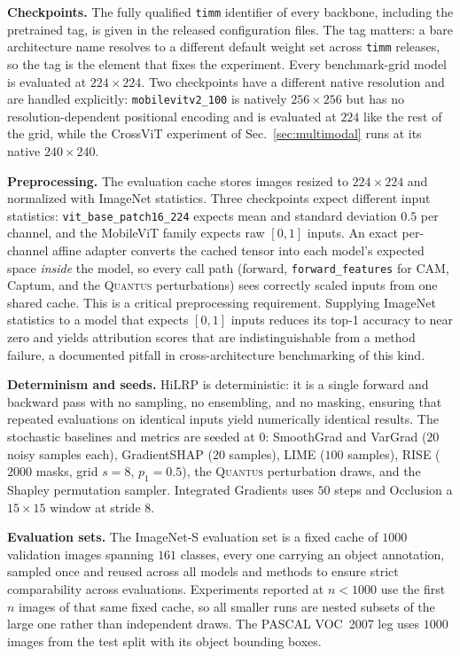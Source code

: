 \documentclass[lettersize,journal]{IEEEtran}
\theoremstyle{definition}
\theoremstyle{plain}
\begin{document}
\textbf{Checkpoints.} The fully qualified \texttt{timm} identifier of every
backbone, including the pretrained tag, is given in the released configuration
files. The tag matters: a bare architecture name resolves to a different default
weight set across \texttt{timm} releases, so the tag is the element that fixes the
experiment. Every benchmark-grid model is evaluated at $224{\times}224$. Two
checkpoints have a different native resolution and are handled explicitly:
\texttt{mobilevitv2\_100} is natively $256{\times}256$ but has no
resolution-dependent positional encoding and is evaluated at $224$ like the rest
of the grid, while the CrossViT experiment of Sec.~\ref{sec:multimodal} runs at
its native $240{\times}240$.

\textbf{Preprocessing.} The evaluation cache stores images resized to
$224{\times}224$ and normalized with ImageNet statistics. Three checkpoints
expect different input statistics: \texttt{vit\_base\_patch16\_224} expects
mean and standard deviation $0.5$ per channel, and the MobileViT family expects
raw $[0,1]$ inputs. An exact per-channel affine adapter converts the cached
tensor into each model's expected space \emph{inside} the model, so every call
path (forward, \texttt{forward\_features} for CAM, Captum, and the \textsc{Quantus}
perturbations) sees correctly scaled inputs from one shared cache. This is a
critical preprocessing requirement. Supplying ImageNet statistics to a model
that expects $[0,1]$ inputs reduces its top-1 accuracy to near zero and yields
attribution scores that are indistinguishable from a method failure, a
documented pitfall in cross-architecture benchmarking of this kind.

\textbf{Determinism and seeds.} HiLRP is deterministic: it is a single forward
and backward pass with no sampling, no ensembling, and no masking, ensuring that
repeated evaluations on identical inputs yield numerically identical results. The stochastic baselines and
metrics are seeded at $0$: SmoothGrad and VarGrad ($20$ noisy samples each),
GradientSHAP ($20$ samples), LIME ($100$ samples), RISE ($2000$ masks, grid
$s{=}8$, $p_1{=}0.5$), the \textsc{Quantus} perturbation draws, and the Shapley
permutation sampler. Integrated Gradients uses $50$ steps and Occlusion a
$15{\times}15$ window at stride $8$.

\textbf{Evaluation sets.} The ImageNet-S evaluation set is a fixed cache of
$1000$ validation images spanning $161$ classes, every one carrying an object
annotation, sampled once and reused across all models and methods to ensure
strict comparability across evaluations. Experiments reported at $n<1000$ use the
first $n$ images of that same fixed cache, so all smaller runs are nested
subsets of the large one rather than independent draws. The PASCAL VOC~2007 leg
uses $1000$ images from the test split with its object bounding boxes.
\end{document}
